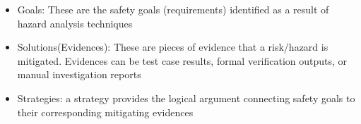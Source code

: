 \documentclass[11pt]{article}
\begin{document}
\begin{itemize}
\item Goals: These are the safety goals (requirements) identified as a result of hazard analysis techniques
\item Solutions(Evidences): These are pieces of evidence that a risk/hazard is mitigated. Evidences can be test case results, formal verification outputs, or manual investigation reports
\item Strategies: a strategy provides the logical argument connecting safety goals to their corresponding mitigating evidences
\end{itemize}

%
%
%
%
%
%
%
%
%
\end{document}
